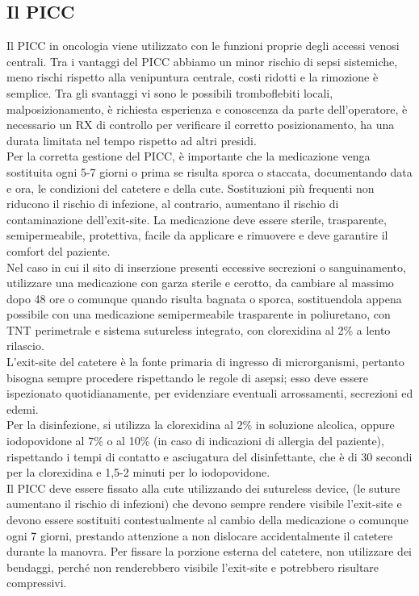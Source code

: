 \subsection{Il PICC}

Il PICC in oncologia viene utilizzato con le funzioni proprie degli accessi venosi centrali. 
Tra i vantaggi del PICC abbiamo un minor rischio di sepsi sistemiche, meno rischi rispetto alla venipuntura 
centrale, costi ridotti e la rimozione è semplice. Tra gli svantaggi vi sono le possibili tromboflebiti locali, 
malposizionamento, è richiesta esperienza e conoscenza da parte dell’operatore, è necessario un RX di controllo per 
verificare il corretto posizionamento, ha una durata limitata nel tempo rispetto ad altri presidi\cite{LINEEGUIDA}.\\ 
Per la corretta gestione del PICC, è importante che la medicazione venga sostituita ogni 5-7 giorni o prima se risulta
sporca o staccata, documentando data e ora, le condizioni del catetere e della cute. Sostituzioni più frequenti non 
riducono il rischio di infezione, al contrario, aumentano il rischio di contaminazione dell’exit-site\cite{AIOMCVC}. 
La medicazione deve essere sterile, trasparente, semipermeabile, protettiva, facile da applicare e rimuovere e 
deve garantire il comfort del paziente.\\
Nel caso in cui il sito di inserzione presenti eccessive secrezioni o sanguinamento, utilizzare una medicazione con 
garza sterile e cerotto, da cambiare al massimo dopo 48 ore o comunque quando risulta bagnata o sporca, sostituendola 
appena possibile con una medicazione semipermeabile trasparente in poliuretano, con TNT perimetrale e sistema 
sutureless integrato, con clorexidina al 2\% a lento rilascio\cite{AIOMCVC}.\\

L'exit-site del catetere è la fonte primaria di ingresso di microrganismi, pertanto bisogna sempre procedere 
rispettando le regole di asepsi; esso deve essere ispezionato quotidianamente, per evidenziare eventuali arrossamenti, 
secrezioni ed edemi\cite{AIOMCVC}.\\
Per la disinfezione, si utilizza la clorexidina al 2\% in soluzione alcolica, oppure iodopovidone al 7\% o al 10\% 
(in caso di indicazioni di allergia del paziente), rispettando i tempi di
contatto e asciugatura del disinfettante, che è di 30 secondi per la clorexidina e 1,5-2 minuti per lo iodopovidone.\\
Il PICC deve essere fissato alla cute utilizzando dei sutureless device, (le suture aumentano il rischio di infezioni) 
che devono sempre rendere visibile l'exit-site e devono essere sostituiti contestualmente al cambio della medicazione 
o comunque ogni 7 giorni, prestando attenzione a non dislocare accidentalmente il catetere durante la manovra. 
Per fissare la porzione esterna del catetere, non utilizzare dei bendaggi, perché non renderebbero visibile l'exit-site 
e potrebbero risultare compressivi\cite{AIOMCVC}.\\

